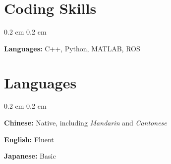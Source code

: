 \documentclass[10pt, letterpaper]{article}
\newenvironment{onecolentry}{
    \begin{adjustwidth}{
        0.2 cm
    }{
        0.2 cm
    }
}{
    \end{adjustwidth}
} %
\newenvironment{twocolentry}[2][]{
    \onecolentry
    \def\secondColumn{#2}
    \setcolumnwidth{\fill, 4.0 cm}
    \begin{paracol}{2}
}{
    \switchcolumn \raggedleft \secondColumn
    \end{paracol}
    \endonecolentry
} %
\let\hrefWithoutArrow\href
\renewcommand{\href}[2]{\hrefWithoutArrow{#1}{\ifthenelse{\equal{#2}{}}{ }{#2 }\raisebox{.15ex}{\footnotesize \faExternalLink*}}}
\begin{document}











\section{Coding Skills}

\begin{onecolentry}
  \textbf{Languages:} C++, Python, MATLAB, ROS
\end{onecolentry}

\vspace{0.2 cm}

\section{Languages}

\begin{onecolentry}
  \textbf{Chinese:} Native, including \textit{Mandarin} and \textit{Cantonese}

  \textbf{English:} Fluent
  
  \textbf{Japanese:} Basic
\end{onecolentry}
\end{document}
